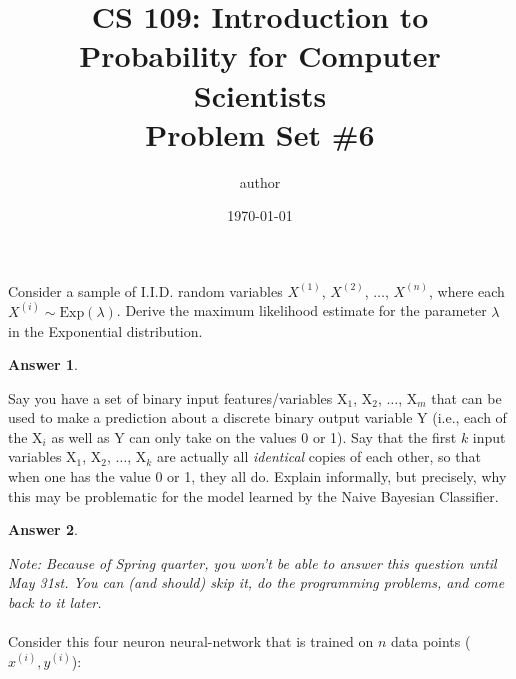 \documentclass[12pt]{article}
\title{CS 109: Introduction to Probability for Computer Scientists\\Problem Set \#6}
\author{\Large{author}} %
\date{\Large{\today}} %
\renewcommand{\(}{\left(}
\renewcommand{\)}{\right)}
\theoremstyle{definition}
\newtheorem*{answer}{Answer}
\begin{document}
\maketitle

\begin{enumerate}
\large{
    \item Consider a sample of I.I.D. random variables $X^{(1)}$, $X^{(2)}$, $\ldots$, $X^{(n)}$, where each $X^{(i)} \sim \text{Exp}(\lambda)$. Derive the maximum likelihood estimate for the parameter $\lambda$ in the Exponential distribution.
    
    \begin{shaded}
    \begin{answer}
    
    \end{answer}
    \end{shaded}
    \newpage
    
    \item Say you have a set of binary input features/variables X$_1$, X$_2$, $\ldots$, X$_m$ that can be used to make a prediction about a discrete binary output variable Y (i.e., each of the X$_i$ as well as Y can only take on the values 0 or 1). Say that the first $k$ input variables X$_1$, X$_2$, $\ldots$, X$_k$ are actually all \textit{identical} copies of each other, so that when one has the value 0 or 1, they all do. Explain informally, but precisely, why this may be problematic for the model learned by the Naive Bayesian Classifier.
    
    \begin{shaded}
    \begin{answer}
    
    \end{answer}
    \end{shaded}
    \newpage
    
    \item \textit{Note: Because of Spring quarter, you won't be able to answer this question until May 31st. You can (and should) skip it, do the programming problems, and come back to it later.}\\ \\
    Consider this four neuron neural-network that is trained on $n$ data points ($x^{(i)}, y^{(i)}$):\\ \\
    
    \begin{center}
\end{center}}
\end{enumerate}
\end{document}
